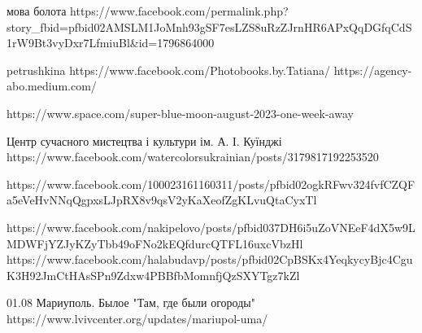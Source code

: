 мова болота
https://www.facebook.com/permalink.php?story_fbid=pfbid02AMSLM1JoMnh93gSF7esLZS8uRzZJrnHR6APxQqDGfqCdS1rW9Bt3vyDxr7LfmiuBl&id=1796864000

petrushkina
https://www.facebook.com/Photobooks.by.Tatiana/
https://agency-abo.medium.com/%

https://www.space.com/super-blue-moon-august-2023-one-week-away

Центр сучасного мистецтва і культури ім. А. І. Куїнджі
https://www.facebook.com/watercolorsukrainian/posts/3179817192253520

https://www.facebook.com/100023161160311/posts/pfbid02ogkRFwv324fvfCZQFa5eVeHvNNqQgpxsLJpRX8v9qsV2yKaXeofZgKLvuQtaCyxTl

https://www.facebook.com/nakipelovo/posts/pfbid037DH6i5uZoVNEeF4dX5w9LMDWFjYZJyKZyTbb49oFNo2kEQfdurcQTFL16uxcVbzHl
https://www.facebook.com/halabudavp/posts/pfbid02CpBSKx4YeqkycyBjc4CguK3H92JmCtHAsSPn9Zdxw4PBBfbMomnfjQzSXYTgz7kZl

01.08 Мариуполь. Былое "Там, где были огороды"
https://www.lvivcenter.org/updates/mariupol-uma/

